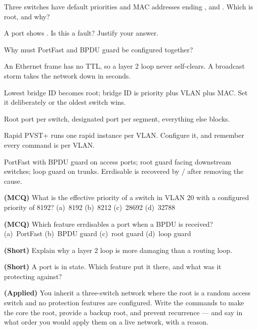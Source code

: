 \begin{checkpoint}
\begin{tightnum}
  \item Three switches have default priorities and MAC addresses ending
        ,  and . Which is root, and why?
  \item A port shows . Is this a fault? Justify your answer.
  \item Why must PortFast and BPDU guard be configured together?
\end{tightnum}
\end{checkpoint}

\begin{chaptersummary}
\begin{tight}
  \item An Ethernet frame has no TTL, so a layer 2 loop never self-clears. A
        broadcast storm takes the network down in seconds.
  \item Lowest bridge ID becomes root; bridge ID is priority plus VLAN plus MAC.
        Set it deliberately or the oldest switch wins.
  \item Root port per switch, designated port per segment, everything else
        blocks.
  \item Rapid PVST+ runs one rapid instance per VLAN. Configure it, and remember
        every command is per VLAN.
  \item PortFast with BPDU guard on access ports; root guard facing downstream
        switches; loop guard on trunks. Errdisable is recovered by
        / after removing the cause.
\end{tight}
\end{chaptersummary}

\begin{reviewq}
  \item \textbf{(MCQ)} What is the effective priority of a switch in VLAN 20 with
        a configured priority of 8192? (a)~8192 (b)~8212 (c)~28692 (d)~32788
  \item \textbf{(MCQ)} Which feature errdisables a port when a BPDU is received?
        (a)~PortFast (b)~BPDU guard (c)~root guard (d)~loop guard
  \item \textbf{(Short)} Explain why a layer 2 loop is more damaging than a
        routing loop.
  \item \textbf{(Short)} A port is in  state. Which feature
        put it there, and what was it protecting against?
  \item \textbf{(Applied)} You inherit a three-switch network where the root is a
        random access switch and no protection features are configured. Write the
        commands to make the core the root, provide a backup root, and prevent
        recurrence --- and say in what order you would apply them on a live
        network, with a reason.
\end{reviewq}
